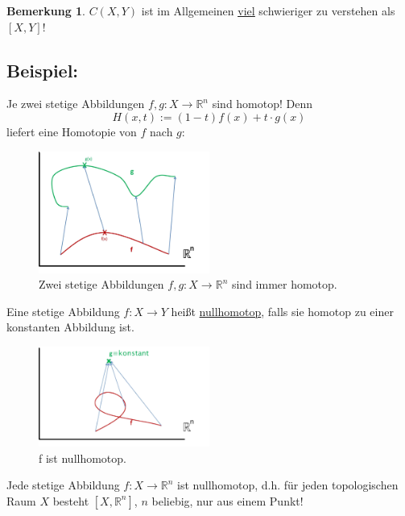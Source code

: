 \documentclass[a4paper,11pt,notitlepage]{report}
\theoremstyle{definition}
\newtheorem{remark}{Bemerkung}[chapter]
\newcommand{\R}{{\ensuremath{\mathbb{R}}}}
\newenvironment{bsp}[1]
{
\setlength{\fboxsep}{10pt}
\subsection*{Beispiel: #1}
\begin{upshape}
}
{
\end{upshape}
}
\newenvironment{definition}[1]{
	\begin{definitions}
	\marginnote{\emph{#1}}
}{\end{definitions}}
\begin{document}
\begin{remark}
$C(X,Y)$ ist im Allgemeinen \underline{\underline{viel}} schwieriger zu verstehen als $[X,Y]$!
\end{remark}

\begin{bsp}{}
Je zwei stetige Abbildungen $f,g \colon X \rightarrow \R^n$ sind homotop! Denn 
$$H(x,t):= (1-t) f(x) + t \cdot g(x)$$ liefert eine Homotopie von $f$ nach $g$:
\begin{figure}[h]
\centering
\includegraphics[width=0.5\textwidth]{images/R_n_immer_homotop.png}
\caption{Zwei stetige Abbildungen $f,g \colon X \rightarrow \R^n$ sind immer homotop.}
\end{figure} 
\end{bsp}

\begin{definition}{Nullhomotopie}
Eine stetige Abbildung $f \colon X \rightarrow Y$ heißt \underline{nullhomotop}, falls sie homotop zu einer konstanten Abbildung ist.
\end{definition}

\begin{figure}[h]
\centering
\includegraphics[width=0.5\textwidth]{images/Nullhomotopie.png}
\caption{f ist nullhomotop.}
\end{figure}

\begin{corollary}
Jede stetige Abbildung $f \colon X \rightarrow \R^n$ ist nullhomotop, d.h. für jeden topologischen Raum $X$ besteht $[X, \R^n]$, $n$ beliebig, nur aus einem Punkt!
\end{corollary}
\end{document}
